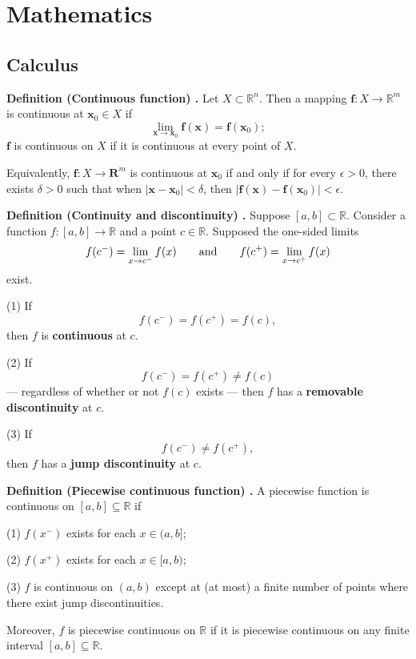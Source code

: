 \chapter{Mathematics}
\section{Calculus}

\begin{shaded}
\textbf{Definition (Continuous function) \cite{hubbard_hubbard}.} Let $X \subset \mathbb{R}^n$. Then a mapping $\mathbf{f} : X \to \mathbb{R}^m$ is continuous at $\mathbf{x}_0 \in X$ if
$$ \lim_{\mathbf{x} \to \mathbf{x}_0} \mathbf{f}(\mathbf{x}) = \mathbf{f}(\mathbf{x}_0); $$
$\mathbf{f}$ is continuous on $X$ if it is continuous at every point of $X$.

Equivalently, $\mathbf{f}: X \to \mathbf{R}^m$ is continuous at $\mathbf{x}_0$ if and only if for every $\epsilon > 0$, there exists $\delta > 0$ such that when $|\mathbf{x} - \mathbf{x}_0| < \delta$, then $|\mathbf{f}(\mathbf{x}) - \mathbf{f}(\mathbf{x}_0)| < \epsilon$.
\end{shaded}

\begin{shaded}
\textbf{Definition (Continuity and discontinuity) \cite{math2111_notes}.} Suppose $[a, b] \subset \mathbb{R}$. Consider a function $f : [a, b] \to \mathbb{R}$ and a point $c \in \mathbb{R}$. Supposed the one-sided limits
$$ f(c^-) = \lim_{x \to c^-} f(x) \qquad \textnormal{and} \qquad f(c^+) = \lim_{x \to c^+} f(x) $$
exist.

(1) If
$$ f(c^-) = f(c^+) = f(c) , $$
then $f$ is \textbf{continuous} at $c$.

(2) If
$$ f(c^-) = f(c^+) \not= f(c) $$
--- regardless of whether or not $f(c)$ exists --- then $f$ has a \textbf{removable discontinuity} at $c$.

(3) If
$$ f(c^-) \not= f(c^+) , $$
then $f$ has a \textbf{jump discontinuity} at $c$.
\end{shaded}

\begin{shaded}
\textbf{Definition (Piecewise continuous function) \cite{math2111_notes}.} A piecewise function is continuous on $[a, b] \subseteq \mathbb{R}$ if

(1) $f(x^-)$ exists for each $x \in (a, b]$;

(2) $f(x^+)$ exists for each $x \in [a, b)$;

(3) $f$ is continuous on $(a, b)$ except at (at most) a finite number of points where there exist jump discontinuities.

Moreover, $f$ is piecewise continuous on $\mathbb{R}$ if it is piecewise continuous on any finite interval $[a, b] \subseteq \mathbb{R}$.
\end{shaded}

